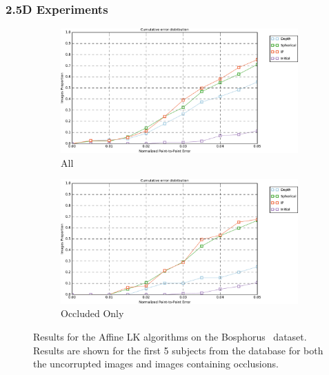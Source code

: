 \subsubsection{2.5D Experiments}\label{subsubsec:singl_img_2d_lk_experiments}
\begin{figure}[t]
    \centering
    \hspace*{\fill}
    \begin{subfigure}[b]{0.49\textwidth}
        \includegraphics[width=\textwidth]{statistical_normals/images/lk2d/lk_first_5_bosphorus}
        \caption{All}\label{subfig:singl_img_depth_lk_results_all}
    \end{subfigure} \hfill
    \begin{subfigure}[b]{0.49\textwidth}
        \includegraphics[width=\textwidth]{statistical_normals/images/lk2d/lk_first_5_bosphorus_dirty}
        \caption{Occluded Only}\label{subfig:singl_img_depth_lk_results_dirty}
    \end{subfigure}
    \hspace*{\fill}
    \caption{Results for the Affine LK algorithms on the
             Bosphorus~\cite{Savran:2008gg} dataset. Results are shown for the
             first 5 subjects from the database for both the uncorrupted images
             and images containing occlusions.}
\label{fig:single_img_2d_lk_results}
\end{figure}
